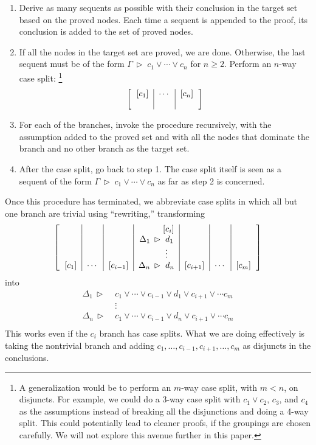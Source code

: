 \documentclass[withtimes,a4paper,12pt]{easychair}
\newcommand\have{\mathrel{\,\vartriangleright\;}}
\begin{document}
\begin{enumerate}
\item Derive as many sequents as possible with their conclusion in the target set
based on the proved nodes. Each time a sequent is appended to the proof, its
conclusion is added to the set of proved nodes.

\item If all the nodes in the target set are proved, we are done. Otherwise, the
last sequent must be of the form $\Gamma \have c_1 \lor \cdots \lor c_n$ for $n
\ge 2$. Perform an $n$-way case split:%
\footnote{A generalization would be to perform an $m$-way case split, with $m <
n$, on disjuncts. For example, we could do a 3-way case split with $c_1 \lor
c_2$, $c_3$, and $c_4$ as the assumptions instead of breaking all the
disjunctions and doing a 4-way split. This could potentially lead to cleaner
proofs, if the groupings are chosen carefully. We will not explore this avenue
further in this paper.}
\[
\left[\begin{tabular}{c|c|c}
$[c_1]$ & $\cdots$ & $[c_n]$ \\
 & & 
\end{tabular}
\right]
\]

\item For each of the branches, invoke the procedure recursively, with the
assumption added to the proved set and with all the nodes that dominate the
branch and no other branch as the target set.

\item After the case split, go back to step 1. The case split itself is seen as
a sequent of the form $\Gamma \have c_1 \lor \cdots \lor c_n$ as far as step 2
is concerned.
\end{enumerate}

Once this procedure has terminated, we abbreviate case splits in which all
but one branch are trivial using ``rewriting,'' transforming
\[
\left[\begin{tabular}{c|c|c|r@{}l|c|c|c}
&&& $[$ & $c_i]$ &&& \\
&&& $\Delta_1 \have {}$ & $d_1$ &&& \\
&&&& $\vdots$ &&& \\
$[c_1]$ & $\cdots$ & $[c_{i-1}]$ & $\Delta_n \have {}$ & $d_n$ & $[c_{i+1}]$ & $\cdots$ & $[c_m]$
\end{tabular}
\right]
\]
into
\begin{align*}
\Delta_1 \have {} & c_1 \lor \cdots \lor c_{i-1} \lor d_1 \lor c_{i+1} \lor \cdots c_m \\
& \vdots \\
\Delta_n \have {} & c_1 \lor \cdots \lor c_{i-1} \lor d_n \lor c_{i+1} \lor \cdots c_m \\
\end{align*}
This works even if the $c_i$ branch has case splits. What we are doing
effectively is taking the nontrivial branch and adding $c_1, \ldots, c_{i-1},
c_{i+1}, \ldots, c_m$ as disjuncts in the conclusions.
\end{document}
